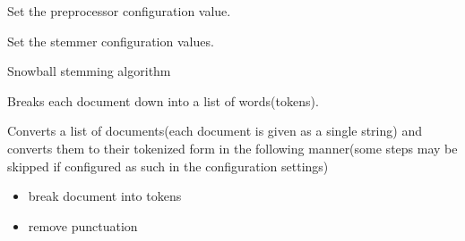 \documentclass[letterpaper,10pt,english]{sphinxmanual}
\begin{document}
\begin{fulllineitems}
\begin{fulllineitems}
\end{fulllineitems}


\begin{fulllineitems}
\label{\detokenize{KUHERD:KUHERD.HerdVectorizer.HerdVectorizer.set_preproc_config}}
Set the preprocessor configuration value.

\end{fulllineitems}


\begin{fulllineitems}
\label{\detokenize{KUHERD:KUHERD.HerdVectorizer.HerdVectorizer.set_stemmer}}
Set the stemmer configuration values.

\end{fulllineitems}


\begin{fulllineitems}
\label{\detokenize{KUHERD:KUHERD.HerdVectorizer.HerdVectorizer.snowball_stemmer}}
Snowball stemming algorithm

\end{fulllineitems}


\begin{fulllineitems}
\label{\detokenize{KUHERD:KUHERD.HerdVectorizer.HerdVectorizer.tokenize_docs}}
Breaks each document down into a list of words(tokens).

Converts a list of documents(each document is given as a single string) and converts them to their tokenized
form in the following manner(some steps may be skipped if configured as such in the configuration settings)
\begin{itemize}
\item {} 
break document into tokens

\item {} 
remove punctuation


\end{itemize}
\end{fulllineitems}
\end{fulllineitems}
\end{document}
